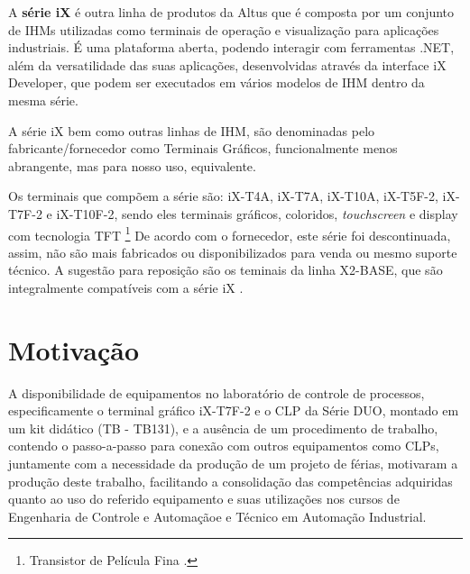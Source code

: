 A \textbf{série iX} é outra linha de produtos da Altus que é composta por um conjunto de \acrshort{IHM}s utilizadas como terminais de operação e visualização para aplicações industriais. É uma plataforma aberta, podendo interagir com ferramentas .NET, além da versatilidade das suas aplicações, desenvolvidas através da interface iX Developer, que podem ser executados em vários modelos de IHM dentro da mesma série.

\begin{figure}[h!]
	\centering
\end{figure}

A série iX bem como outras linhas de IHM, são denominadas pelo fabricante/fornecedor como Terminais Gráficos, funcionalmente menos abrangente, mas para nosso uso, equivalente. 


Os terminais que compõem a série são: iX-T4A, iX-T7A, iX-T10A, iX-T5F-2, iX-T7F-2 e iX-T10F-2, sendo eles terminais gráficos, coloridos, \textit{touchscreen} e display com tecnologia TFT \footnote{Transistor de Película Fina \cite{tecnoblog_tft}. }
De acordo com o fornecedor, este série foi descontinuada, assim, não são mais fabricados ou disponibilizados para venda ou mesmo suporte técnico. A sugestão para reposição são os teminais da linha X2-BASE, que são integralmente compatíveis com a série iX \cite{ix_t7f_2-x2_base_7}.


\section{Motivação}
\label{sec:motivacao}

A disponibilidade de equipamentos no laboratório de controle de processos, especificamente o terminal gráfico iX-T7F-2 e o CLP da Série DUO, montado em um kit didático (\acrlong{TB} - TB131), e a ausência de um procedimento de trabalho, contendo o passo-a-passo para conexão com outros equipamentos como \acrshort{CLP}s, juntamente com a necessidade da produção de um projeto de férias, motivaram a produção deste trabalho, facilitando a consolidação das competências adquiridas quanto ao uso do referido equipamento e suas utilizações nos cursos de Engenharia de Controle e Automaçãoe e Técnico em Automação Industrial.  




